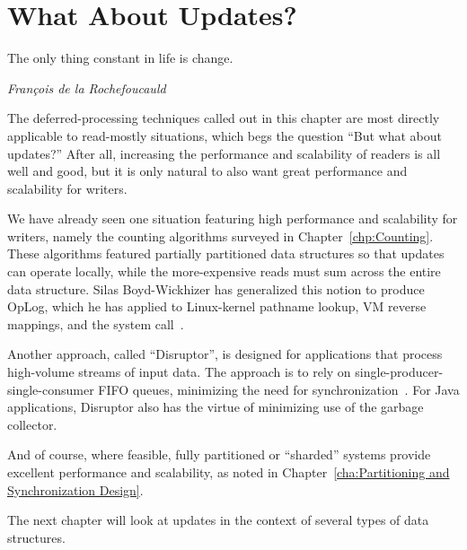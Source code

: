 
\section{What About Updates?}
\label{sec:defer:What About Updates?}
%
\epigraph{The only thing constant in life is change.}
	 {\emph{Fran\c{c}ois de la Rochefoucauld}}

The deferred-processing techniques called out in this chapter are most
directly applicable to read-mostly situations, which begs the question
``But what about updates?''
After all, increasing the performance and scalability of readers is all
well and good, but it is only natural to also want great performance and
scalability for writers.

We have already seen one situation featuring high performance and
scalability for writers, namely the counting algorithms surveyed in
Chapter~\ref{chp:Counting}.
These algorithms featured partially partitioned data structures so
that updates can operate locally, while the more-expensive reads
must sum across the entire data structure.
Silas Boyd-Wickhizer has generalized this notion to produce
OpLog, which he has applied to
Linux-kernel pathname lookup, VM reverse mappings, and the  system
call~\cite{SilasBoydWickizerPhD}.

Another approach, called ``Disruptor'', is designed for applications
that process high-volume streams of input data.
The approach is to rely on single-producer-single-consumer FIFO queues,
minimizing the need for synchronization~\cite{AdrianSutton2013LCA:Disruptor}.
For Java applications, Disruptor also has the virtue of minimizing use
of the garbage collector.

And of course, where feasible, fully partitioned or ``sharded'' systems
provide excellent performance and scalability, as noted in
Chapter~\ref{cha:Partitioning and Synchronization Design}.

The next chapter will look at updates in the context of several types
of data structures.
